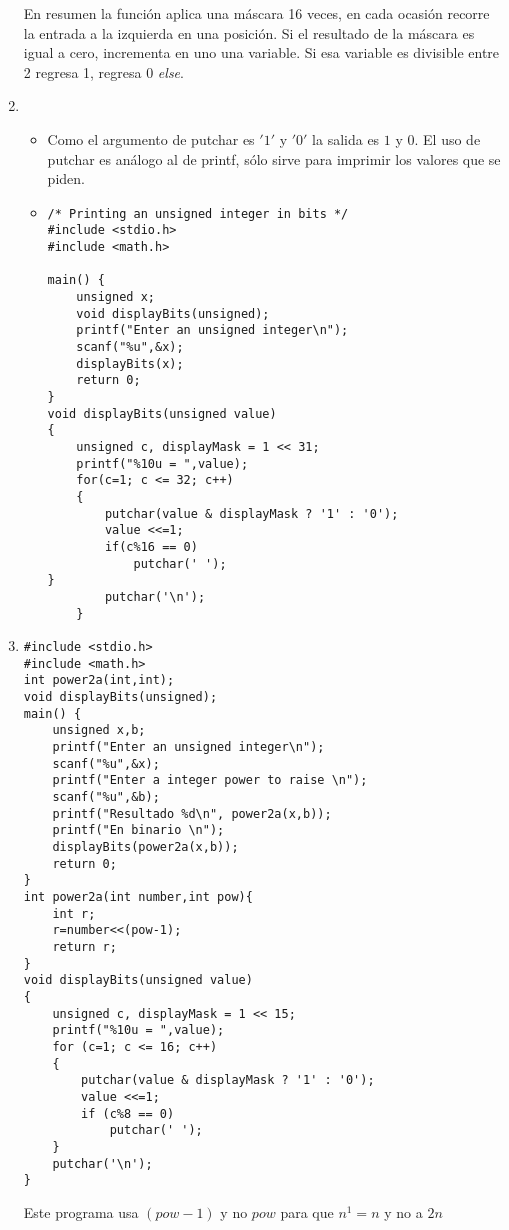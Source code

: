\documentclass[a4paper,10pt]{article}
\begin{document}
\begin{enumerate}
En resumen la función aplica una máscara 16 veces, en cada ocasión recorre la entrada a la izquierda en una posición. Si el resultado de la máscara es igual a cero, incrementa en uno una variable. Si esa variable es divisible entre 2 regresa 1,  regresa 0 \emph{else}. 
\item \begin{itemize}
\item Como el argumento de putchar es $'1'$ y $'0'$ la salida es $1$ y $0$. El uso de putchar es análogo al de printf, sólo sirve para imprimir los valores que se piden. 
\item \begin{verbatim}
/* Printing an unsigned integer in bits */
#include <stdio.h>
#include <math.h>

main() {
    unsigned x;
    void displayBits(unsigned);
    printf("Enter an unsigned integer\n");
    scanf("%u",&x);
    displayBits(x);
    return 0;
}
void displayBits(unsigned value)
{
    unsigned c, displayMask = 1 << 31;
    printf("%10u = ",value);
    for(c=1; c <= 32; c++)
    {
        putchar(value & displayMask ? '1' : '0');
        value <<=1;
        if(c%16 == 0)
            putchar(' ');
}
        putchar('\n');
    }

\end{verbatim}
\end{itemize}
\item \begin{verbatim}
#include <stdio.h>
#include <math.h>
int power2a(int,int);
void displayBits(unsigned);
main() {
    unsigned x,b;
    printf("Enter an unsigned integer\n");
    scanf("%u",&x);
    printf("Enter a integer power to raise \n");
    scanf("%u",&b);
    printf("Resultado %d\n", power2a(x,b));
    printf("En binario \n");
    displayBits(power2a(x,b));
    return 0;
}
int power2a(int number,int pow){
    int r;
    r=number<<(pow-1);
    return r;
}
void displayBits(unsigned value)
{
    unsigned c, displayMask = 1 << 15;
    printf("%10u = ",value);
    for (c=1; c <= 16; c++)
    {
        putchar(value & displayMask ? '1' : '0');
        value <<=1;
        if (c%8 == 0)
            putchar(' ');
    }
    putchar('\n');
}
\end{verbatim}
Este programa usa $(pow-1)$ y no $pow$ para que $n^1=n$ y no a $2n$
\end{enumerate}
\end{document}

